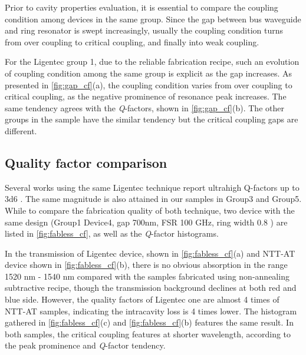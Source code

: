 Prior to cavity properties evaluation, it is essential to compare the coupling condition among devices in the same group. Since the gap between bus waveguide and ring resonator is swept increasingly, usually the coupling condition turns from over coupling to critical coupling, and finally into weak coupling.

For the Ligentec group 1, due to the reliable fabrication recipe, such an evolution of coupling condition among the same group is explicit as the gap increases.
As presented in \autoref{fig:gap_cf}(a), the coupling condition varies from over coupling to critical coupling, as the negative prominence of resonance peak increases. The same tendency agrees with the \textit{Q}-factors, shown in \autoref{fig:gap_cf}(b). The other groups in the sample have the similar tendency but the critical coupling gaps are different.

\begin{figure}
	\centering
	
	\label{fig:gap_cf}
\end{figure}

\subsection{Quality factor comparison}


Several works using the same Ligentec technique report ultrahigh Q-factors up to \num{3d6} \cites{Yu2019, Vaidya2019}. The same magnitude is also attained in our samples in Group3 and Group5. While to compare the fabrication quality of both technique, two device with the same design (Group1 Device4, gap 700nm, FSR 100 GHz, ring width 0.8 \um ) are listed in \autoref{fig:fabless_cf}, as well as the \textit{Q}-factor histograms.

\begin{figure}
	\centering
	
	\label{fig:fabless_cf}
\end{figure}

In the transmission of Ligentec device, shown in \autoref{fig:fabless_cf}(a)  and NTT-AT device shown in \autoref{fig:fabless_cf}(b), there is no obvious absorption in the range 1520 nm - 1540 nm compared with the samples fabricated using non-annealing subtractive recipe, though the transmission background declines at both red and blue side. However, the quality factors of Ligentec one are almost 4 times of NTT-AT samples, indicating the intracavity loss is 4 times lower. The histogram gathered in \autoref{fig:fabless_cf}(c) and \autoref{fig:fabless_cf}(b) features the same result.
In both samples, the critical coupling features at shorter wavelength, according to the peak prominence and \textit{Q}-factor tendency. 

